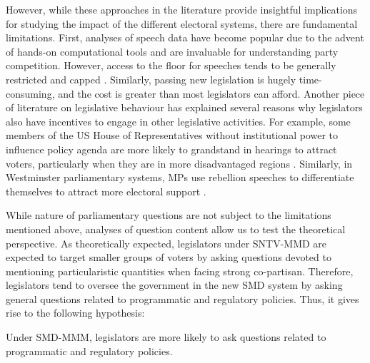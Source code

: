 However, while these approaches in the literature provide insightful implications for studying the impact of the different electoral systems, there are fundamental limitations. First, analyses of speech data have become popular due to the advent of hands-on computational tools and are invaluable for understanding party competition. However, access to the floor for speeches tends to be generally restricted and capped \citep{Proksch2009, Martin2011}. Similarly, passing new legislation is hugely time-consuming, and the cost is greater than most legislators can afford. Another piece of literature on legislative behaviour has explained several reasons why legislators also have incentives to engage in other legislative activities. For example, some members of the US House of Representatives without institutional power to influence policy agenda are more likely to grandstand in hearings to attract voters, particularly when they are in more disadvantaged regions \citep{Park2021}. Similarly, in Westminster parliamentary systems, MPs use rebellion speeches to differentiate themselves to attract more electoral support \citep{Slapin2018, Proksch2015}.

While nature of parliamentary questions are not subject to the limitations mentioned above, analyses of question content allow us to test the theoretical perspective. As theoretically expected, legislators under SNTV-MMD are expected to target smaller groups of voters by asking questions devoted to mentioning particularistic quantities when facing strong co-partisan. Therefore, legislators tend to oversee the government in the new SMD system by asking general questions related to programmatic and regulatory policies. Thus, it gives rise to the following hypothesis:

\begin{hyp}
Under SMD-MMM, legislators are more likely to ask questions related to programmatic and regulatory policies.\label{h:h2} 
\end{hyp}


